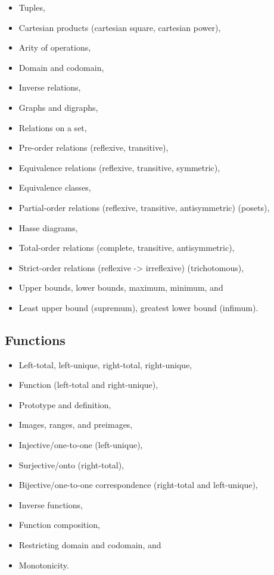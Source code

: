 \begin{itemize}
\tightlist
\item
  Tuples,
\item
  Cartesian products (cartesian square, cartesian power),
\item
  Arity of operations,
\item
  Domain and codomain,
\item
  Inverse relations,
\item
  Graphs and digraphs,
\item
  Relations on a set,
\item
  Pre-order relations (reflexive, transitive),
\item
  Equivalence relations (reflexive, transitive, symmetric),
\item
  Equivalence classes,
\item
  Partial-order relations (reflexive, transitive, antisymmetric)
  (posets),
\item
  Hasse diagrams,
\item
  Total-order relations (complete, transitive, antisymmetric),
\item
  Strict-order relations (reflexive -\textgreater{} irreflexive)
  (trichotomous),
\item
  Upper bounds, lower bounds, maximum, minimum, and
\item
  Least upper bound (supremum), greatest lower bound (infimum).
\end{itemize}

\hypertarget{functions}{%
\subsection{Functions}\label{functions}}

\begin{itemize}
\tightlist
\item
  Left-total, left-unique, right-total, right-unique,
\item
  Function (left-total and right-unique),
\item
  Prototype and definition,
\item
  Images, ranges, and preimages,
\item
  Injective/one-to-one (left-unique),
\item
  Surjective/onto (right-total),
\item
  Bijective/one-to-one correspondence (right-total and left-unique),
\item
  Inverse functions,
\item
  Function composition,
\item
  Restricting domain and codomain, and
\item
  Monotonicity.
\end{itemize}

